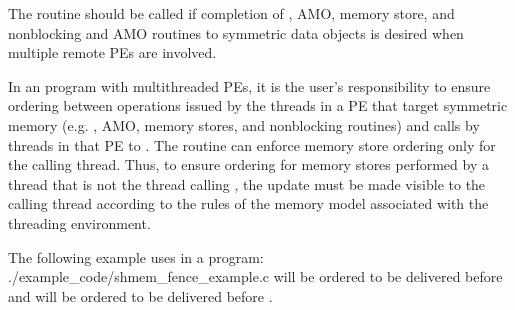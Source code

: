 \begin{apidefinition}
{    The  routine should be called if completion of \PUT{},
    \ac{AMO}, memory store, and nonblocking \PUT{} and \ac{AMO} routines to symmetric data objects is desired
    when multiple remote \acp{PE} are involved.

    In an \openshmem program with multithreaded \acp{PE}, it is the
    user's responsibility to ensure ordering between operations issued by the threads
    in a \ac{PE} that target symmetric memory (e.g. \PUT{}, \ac{AMO}, memory stores,
    and nonblocking routines) and calls by threads in that \ac{PE} to
    . The  routine can enforce memory store ordering only for the
    calling thread. Thus, to ensure ordering for memory stores performed by a thread that is
    not the thread calling , the update must be made visible to the
    calling thread according to the rules of the memory model associated with
    the threading environment.
}

\begin{apiexamples}

\apicexample
    {The following example uses  in a \Cstd[11] program: }
    {./example_code/shmem_fence_example.c}
    { will be ordered to be delivered before  and 
    will be ordered to be delivered before .}

\end{apiexamples}

\end{apidefinition}
